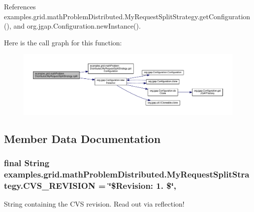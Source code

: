 References examples.\-grid.\-math\-Problem\-Distributed.\-My\-Request\-Split\-Strategy.\-get\-Configuration(), and org.\-jgap.\-Configuration.\-new\-Instance().



Here is the call graph for this function\-:
\nopagebreak
\begin{figure}[H]
\begin{center}
\leavevmode
\includegraphics[width=350pt]{classexamples_1_1grid_1_1math_problem_distributed_1_1_my_request_split_strategy_ab99515a0b31aab87cd16407f04e617e0_cgraph}
\end{center}
\end{figure}




\subsection{Member Data Documentation}
\hypertarget{classexamples_1_1grid_1_1math_problem_distributed_1_1_my_request_split_strategy_a4a79429222cebf8eb018e714d8c36443}{
\subsubsection[{C\-V\-S\-\_\-\-R\-E\-V\-I\-S\-I\-O\-N}]{\setlength{\rightskip}{0pt plus 5cm}final String examples.\-grid.\-math\-Problem\-Distributed.\-My\-Request\-Split\-Strategy.\-C\-V\-S\-\_\-\-R\-E\-V\-I\-S\-I\-O\-N = \char`\"{}\$Revision\-: 1. \$\char`\"{}\hspace{0.3cm}{\ttfamily [static]}, {\ttfamily [private]}}}\label{classexamples_1_1grid_1_1math_problem_distributed_1_1_my_request_split_strategy_a4a79429222cebf8eb018e714d8c36443}
String containing the C\-V\-S revision. Read out via reflection! 

